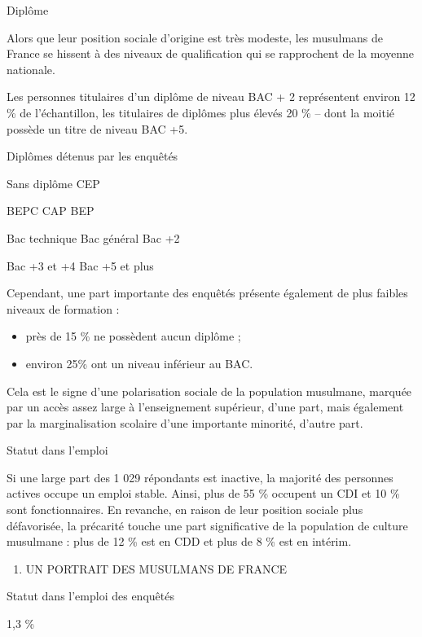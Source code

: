 Diplôme


Alors que leur position sociale d'origine est très modeste, les
musulmans de France se hissent à des niveaux de qualification qui se
rapprochent de la moyenne nationale.

Les personnes titulaires d'un diplôme de niveau BAC + 2 représentent
environ 12 \% de l'échantillon, les titulaires de diplômes plus élevés
20 \% -- dont la moitié possède un titre de niveau BAC +5.


Diplômes détenus par les enquêtés


Sans diplôme CEP

BEPC CAP BEP

Bac technique Bac général Bac +2

Bac +3 et +4 Bac +5 et plus

Cependant, une part importante des enquêtés présente également de plus
faibles niveaux de formation :


\begin{itemize}
\item
  
  près de 15 \% ne possèdent aucun diplôme ;
  
\item
  
  environ 25\% ont un niveau inférieur au BAC.
  
\end{itemize}


Cela est le signe d'une polarisation sociale de la population musulmane,
marquée par un accès assez large à l'enseignement supérieur, d'une part,
mais également par la marginalisation scolaire d'une importante
minorité, d'autre part.


Statut dans l'emploi


Si une large part des 1 029 répondants est inactive, la majorité des
personnes actives occupe un emploi stable. Ainsi, plus de 55 \% occupent
un CDI et 10 \% sont fonctionnaires. En revanche, en raison de leur
position sociale plus défavorisée, la précarité touche une part
significative de la population de culture musulmane : plus de 12 \% est
en CDD et plus de 8 \% est en intérim.


\begin{enumerate}
\def\labelenumi{\Roman{enumi}.}
\item
  UN PORTRAIT DES MUSULMANS DE FRANCE
\end{enumerate}

Statut dans l'emploi des enquêtés

1,3 \%

